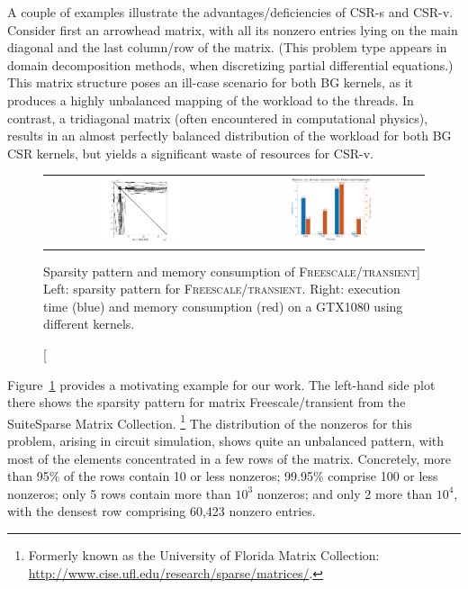 A couple of examples illustrate the advantages/deficiencies
of CSR-s and CSR-v.
Consider first an arrowhead matrix,
with all its nonzero entries lying on the main diagonal
and the last column/row of the matrix.
(This problem type appears in domain decomposition methods,
when discretizing partial differential equations.)
This matrix structure poses an ill-case scenario for both BG kernels,
as it produces a highly unbalanced mapping of the workload to the threads.
In contrast, a tridiagonal matrix
(often encountered in computational physics),
results in an almost perfectly balanced distribution
of the workload for both BG CSR kernels,
but yields a significant waste of resources for CSR-v.

\begin{figure}[t]
\begin{center}
\begin{tabular}{cc}
\includegraphics[width=0.48\textwidth]{plots/pattern.pdf} &
\includegraphics[width=0.48\textwidth]{plots/motivation.pdf}
\end{tabular}
\end{center}
\caption
    [Sparsity pattern and memory consumption of \textsc{Freescale/transient}]
    {Left: sparsity pattern for \textsc{Freescale/transient}.
    Right: execution time (blue) and memory consumption (red) on a GTX1080
    using different \spmv kernels.}
\label{2017-csr-spmv:fig:motivation}
\end{figure}

Figure~\ref{2017-csr-spmv:fig:motivation} provides a motivating example for our work.
The left-hand side plot there shows the sparsity pattern for matrix
{\sc Freescale/transient} from the SuiteSparse Matrix Collection.%
\footnote{Formerly known as the University of Florida Matrix Collection:
\mbox{\url{http://www.cise.ufl.edu/research/sparse/matrices/}}.}
The distribution of the nonzeros for this problem,
arising in circuit simulation, shows quite an unbalanced pattern,
with most of the elements concentrated in a few rows of the matrix.
Concretely, more than 95\% of the rows contain 10 or less nonzeros;
99.95\% comprise 100 or less nonzeros;
only 5 rows contain more than $10^3$ nonzeros; and only 2 more than $10^4$,
with the densest row comprising
60,423 nonzero entries.

